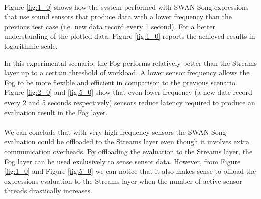 
\paragraph{}
Figure \ref{fig:1_0} shows how the system performed with SWAN-Song expressions that use sound sensors that produce data with a lower frequency than the previous test case (i.e. new data record every 1 second). For a better understanding of the plotted data, Figure \ref{fig:1_0} reports the achieved results in logarithmic scale.

In this experimental scenario, the Fog performs relatively better than the Streams layer up to a certain threshold of workload. A lower sensor frequency allows the Fog to be more flexible and efficient in comparison to the previous scenario. Figure \ref{fig:2_0} and \ref{fig:5_0} show that even lower frequency (a new date record  every 2 and 5 seconds respectively) sensors reduce latency required to produce an evaluation result in the Fog layer. 
\paragraph{}
We can conclude that with very high-frequency sensors the SWAN-Song evaluation could be offloaded to the Streams layer even though it involves extra communication overheads. By offloading the evaluation to the Streams layer, the Fog layer can be used exclusively to sense sensor data. However, from Figure \ref{fig:1_0} and Figure  \ref{fig:5_0} we can notice that it also makes sense to offload the expressions evaluation to the Streams layer when the number of active sensor threads drastically increases. 


